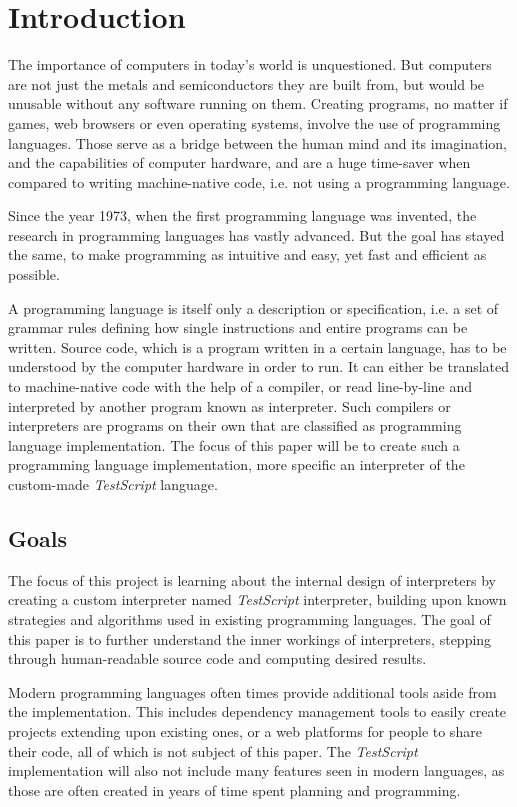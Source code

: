 \documentclass[12pt,a4paper]{article}
\newcommand{\name}{\emph{TestScript}}
\begin{document}
{
    \small
    \newpage
    \hypersetup{hidelinks}
    \tableofcontents\newpage
}

\normalsize
\onehalfspacing
\section{Introduction}
The importance of computers in today's world is unquestioned.
But computers are not just the metals and semiconductors they are built from,
but would be unusable without any software running on them.
Creating programs, no matter if games, web browsers or even operating systems,
involve the use of programming languages.
Those serve as a bridge between the human mind and its imagination, and
the capabilities of computer hardware, and are a huge time-saver when compared
to writing machine-native code, i.e. not using a programming language.

Since the year 1973, when the first programming language was invented, the
research in programming languages has vastly advanced. But the goal has stayed
the same, to make programming as intuitive and easy, yet fast and efficient as
possible.

A programming language is itself only a description or specification, i.e. a
set of grammar rules defining how single instructions and entire programs
can be written. Source code, which is a program written in a certain language,
has to be understood by the computer hardware in order to run. It can either
be translated to machine-native code with the help of a compiler, or
read line-by-line and interpreted by another program known as interpreter.
Such compilers or interpreters are programs on their own that are classified
as programming language implementation. The focus of this paper will be to
create such a programming language implementation, more specific an interpreter
of the custom-made \name{} language.

\subsection{Goals}
The focus of this project is learning about the internal design of interpreters
by creating a custom interpreter named \name{} interpreter, building upon
known strategies and algorithms used in existing programming languages.
The goal of this paper is to further understand the inner workings of
interpreters, stepping through human-readable source code and computing
desired results.

Modern programming languages often times provide additional tools aside from
the implementation. This includes dependency management tools to
easily create projects extending upon existing ones, or a web platforms for
people to share their code, all of which is not subject of this paper.
The \name{} implementation will also not include many features seen in modern
languages, as those are often created in years of time spent planning and
programming.
\end{document}

